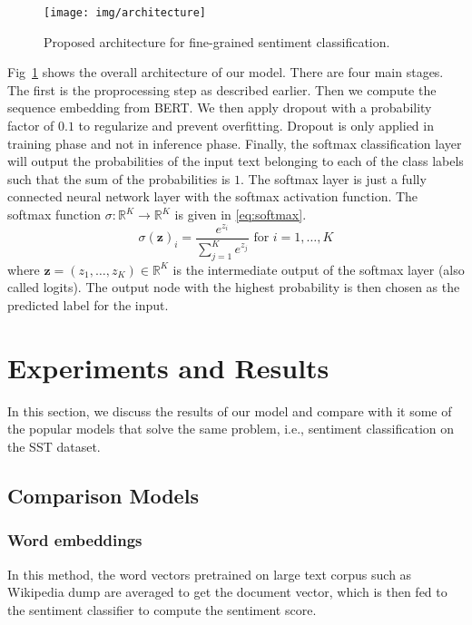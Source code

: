 \documentclass[conference]{IEEEtran}
\begin{document}
\begin{figure}[ht]
    \centering
    \texttt{[image: img/architecture]}
    \caption{Proposed architecture for fine-grained sentiment classification.}
    \label{fig:architecture}
\end{figure}

Fig~\ref{fig:architecture} shows the overall architecture of our model. There are four main stages. The first is the proprocessing step as described earlier. Then we compute the sequence embedding from BERT. We then apply dropout with a probability factor of $0.1$ to regularize and prevent overfitting. Dropout is only applied in training phase and not in inference phase. Finally, the softmax classification layer will output the probabilities of the input text belonging to each of the class labels such that the sum of the probabilities is $1$. The softmax layer is just a fully connected neural network layer with the softmax activation function. The softmax function $\sigma : \mathbb{R}^K \rightarrow \mathbb{R}^K$ is given in \eqref{eq:softmax}.
\begin{equation}
    \sigma(\mathbf{z})_i = \frac{e^{z_i}}{\sum_{j=1}^K e^{z_j}}
    \text{ for } i=1,\ldots,K
    \label{eq:softmax}
\end{equation}
where $\mathbf{z} = (z_1,\ldots,z_K) \in \mathbb{R}^K$ is the intermediate output of the softmax layer (also called logits). The output node with the highest probability is then chosen as the predicted label for the input. \section{Experiments and Results}\label{sec:result}

In this section, we discuss the results of our model and compare with it some of the popular models that solve the same problem, i.e., sentiment classification on the SST dataset.

\subsection{Comparison Models}





\subsubsection{Word embeddings}
In this method, the word vectors pretrained on large text corpus such as Wikipedia dump are averaged to get the document vector, which is then fed to the sentiment classifier to compute the sentiment score.
\end{document}
